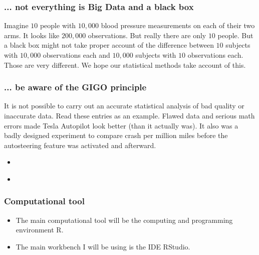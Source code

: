 \documentclass{beamer}
\begin{document}
\begin{frame}
\frametitle{... not everything is Big Data and a black box}
Imagine $10$ people with $10,000$ blood pressure measurements on each of their two arms. It looks like $200,000$ observations.  But really there are only $10$ people. But a black box might not take proper account of the difference between $10$ subjects with $10,000$ observations each and $10,000$ subjects with $10$ observations each. Those are very different. We hope our statistical methods take account of this. 

\end{frame}
\begin{frame}
\frametitle{... be aware of the GIGO principle}

It is not possible to carry out an accurate statistical analysis of bad quality or inaccurate data. Read these  entries as an example. Flawed data and serious math errors made Tesla Autopilot look better (than it actually was). It also was a badly designed experiment to compare crash per million miles before the autosteering feature was activated and afterward. \\[10pt]
\begin{itemize}
\item \href{https://junkcharts.typepad.com/numbersruleyourworld/2019/03/excel-error-but-could-happen-in-any-tool.html}{}
\item \href{https://arstechnica.com/cars/2019/02/in-2017-the-feds-said-tesla-autopilot-cut-crashes-40-that-was-bogus/}{}
\end{itemize}
\end{frame}
\begin{frame}
\frametitle{Computational tool}
\begin{itemize}
\item The main computational tool will be the computing and programming environment R.
\item The main workbench I will be using is the IDE RStudio.
\end{itemize}
\end{frame}
\end{document}
